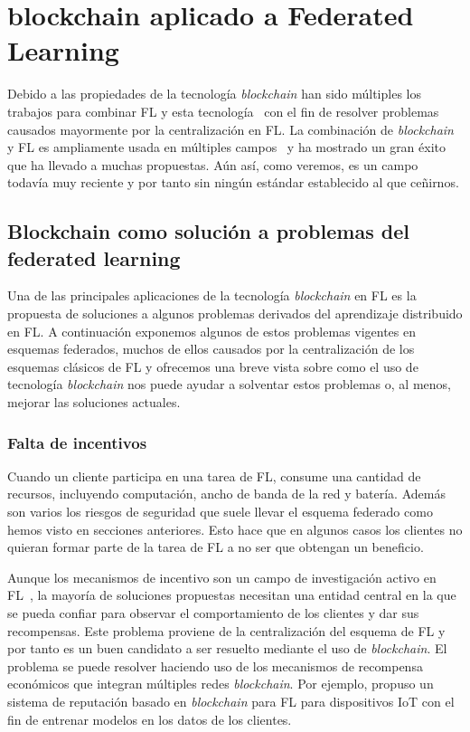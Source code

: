 \chapter{blockchain aplicado a Federated Learning}\label{sec:blockfed}
Debido a las propiedades de la tecnología \textit{blockchain} han sido múltiples los trabajos para combinar \ac{FL} y esta tecnología~\cite{zhu-2023-blockfed} con el fin de resolver problemas causados mayormente por la centralización en \ac{FL}. La combinación de \textit{blockchain} y \ac{FL} es ampliamente usada  en múltiples campos~\cite{kim-2020-blockfl, weng-2021-deepchain} y ha mostrado un gran éxito que ha llevado a muchas propuestas. Aún así, como veremos, es un campo todavía muy reciente y por tanto sin ningún estándar establecido al que ceñirnos.

\section{Blockchain como solución a problemas del federated learning}

Una de las principales aplicaciones de la tecnología \textit{blockchain} en \ac{FL} es la propuesta de soluciones a algunos problemas derivados del aprendizaje distribuido en \ac{FL}. A continuación exponemos algunos de estos problemas vigentes en esquemas federados, muchos de ellos causados por la centralización de los esquemas clásicos de \ac{FL} y ofrecemos una breve vista sobre como el uso de tecnología \textit{blockchain} nos puede ayudar a solventar estos problemas o, al menos, mejorar las soluciones actuales.

\subsection{Falta de incentivos}
Cuando un cliente participa en una tarea de \ac{FL}, consume una cantidad de recursos, incluyendo computación, ancho de banda de la red y batería. Además son varios los riesgos de seguridad que suele llevar el esquema federado como hemos visto en secciones anteriores. Esto hace que en algunos casos los clientes no quieran formar parte de la tarea de \ac{FL} a no ser que obtengan un beneficio. 

Aunque los mecanismos de incentivo son un campo de investigación activo en \ac{FL}~\cite{wang-2018, xu-2015}, la mayoría de soluciones propuestas necesitan una entidad central en la que se pueda confiar para observar el comportamiento de los clientes y dar sus recompensas. Este problema proviene de la centralización del esquema de \ac{FL} y por tanto es un buen candidato a ser resuelto mediante el uso de \textit{blockchain}. El problema se puede resolver haciendo uso de los mecanismos de recompensa económicos que integran múltiples redes \textit{blockchain}. Por ejemplo, \citet{zhao-2021} propuso un sistema de reputación basado en \textit{blockchain} para \ac{FL} para dispositivos \ac{IoT} con el fin de entrenar modelos en los datos de los clientes.

